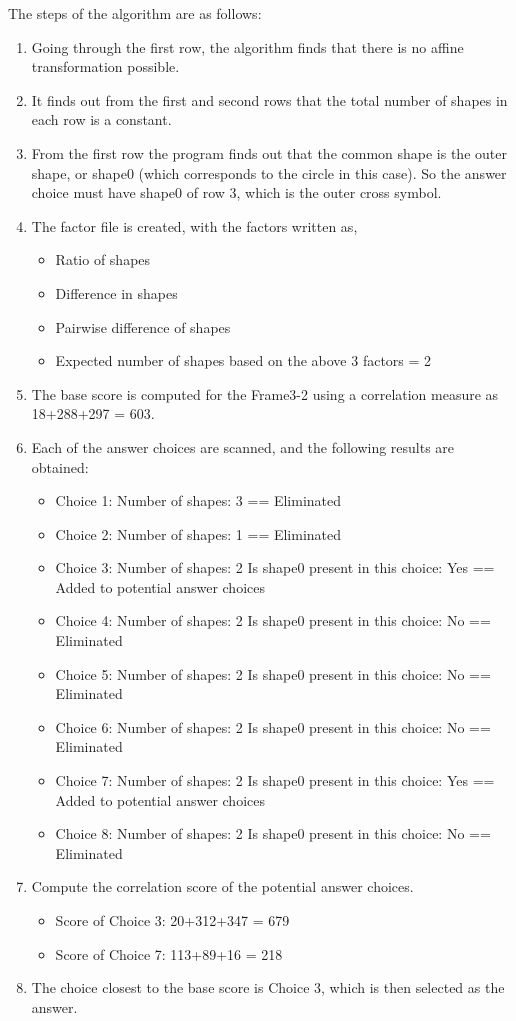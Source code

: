 \documentclass[10pt, letter]{article}
\begin{document}
The steps of the algorithm are as follows:
\begin{enumerate}
\item Going through the first row, the algorithm finds that there is no affine transformation possible.
\item It finds out from the first and second rows that the total number of shapes in each row is a constant.
\item From the first row the program finds out that the common shape is the outer shape, or shape0 (which corresponds to the circle in this case). So the answer choice must have shape0 of row 3, which is the outer cross symbol.
\item The factor file is created, with the factors written as,
	\begin{itemize}
		\item Ratio of shapes
		\item Difference in shapes
		\item Pairwise difference of shapes
		\item Expected number of shapes based on the above 3 factors = 2
	\end{itemize}
\item The base score is computed for the Frame3-2 using a correlation measure as 18+288+297 = 603.
\item Each of the answer choices are scanned, and the following results are obtained:
	\begin{itemize}
		\item Choice 1: Number of shapes: 3 == Eliminated
		\item Choice 2: Number of shapes: 1 == Eliminated
		\item Choice 3: Number of shapes: 2 
						Is shape0 present in this choice: Yes == Added to potential answer choices
		\item Choice 4: Number of shapes: 2
						Is shape0 present in this choice: No == Eliminated
		\item Choice 5: Number of shapes: 2
						Is shape0 present in this choice: No == Eliminated
		\item Choice 6: Number of shapes: 2
						Is shape0 present in this choice: No == Eliminated
		\item Choice 7: Number of shapes: 2
						Is shape0 present in this choice: Yes == Added to potential answer choices
		\item Choice 8: Number of shapes: 2
						Is shape0 present in this choice: No == Eliminated
	\end{itemize}
\item Compute the correlation score of the potential answer choices.
	\begin{itemize}
		\item Score of Choice 3: 20+312+347 = 679
		\item Score of Choice 7: 113+89+16 = 218
	\end{itemize}
\item The choice closest to the base score is Choice 3, which is then selected as the answer.
\end{enumerate}
\end{document}
